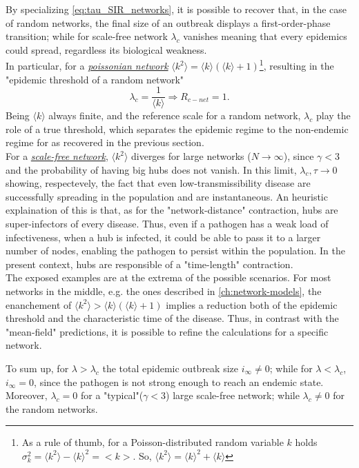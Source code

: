 \documentclass[a4paper,10pt,twoside]{book} %
\theoremstyle{definition}
\begin{document}
By specializing \autoref{eq:tau_SIR_networks}, it is possible to recover that, in the case of random networks, the final size of an outbreak displays a first-order-phase transition; while for scale-free network $\lambda_c$ vanishes meaning that every epidemics could spread, regardless its biological weakness.
\\In particular, for a \underline{\textit{poissonian network}} $\langle k^2 \rangle = \langle k \rangle (\langle k \rangle + 1 )$\footnote{As a rule of thumb, for a Poisson-distributed random variable $k$ holds $\sigma_k^2 = \langle k^2 \rangle - \langle k \rangle^2 = <k>$. So, $\langle k^2 \rangle = \langle k \rangle^2 + \langle k \rangle$}, 
resulting in the "epidemic threshold of a random network" \cite{barabasi::2016networkbook}
\[ \lambda_c = 
	\frac{1}{\langle k \rangle} \Rightarrow R_{c-net} = 1.
\]
Being $\langle k \rangle$ always finite, and the reference scale for a random network, $\lambda_c$ play the role of a true threshold, which separates the epidemic regime to the non-endemic regime for as recovered in the previous section.
\\For a \underline{\textit{scale-free network}}, $\langle k^2 \rangle$ diverges for large networks ($N\to \infty$), since $\gamma < 3$ and the probability of having big hubs does not vanish. In this limit, $\lambda_c, \tau \to 0$ showing, respectevely, the fact that even low-transmissibility disease are successfully spreading in the population and are instantaneous.
An heuristic explaination of this is that, as for the "network-distance" contraction, hubs are super-infectors of every disease. Thus, even if a pathogen has a weak load of infectiveness, when a hub is infected, it could be able to pass it to a larger number of nodes, enabling the pathogen to persist within the population. In the present context, hubs are responsible of a "time-length" contraction.
\\The exposed examples are at the extrema of the possible scenarios. For most networks in the middle, e.g. the ones described in \autoref{ch:network-models}, the enanchement of $\langle k^2 \rangle > \langle k \rangle (\langle k \rangle +1)$ implies a reduction both of the epidemic threshold and the characteristic time of the disease. Thus, in contrast with the "mean-field" predictions, it is possible to refine the calculations for a specific network.

To sum up, for $\lambda>\lambda_c$ the total epidemic outbreak size $i_{\infty} \neq0$; while for $\lambda < \lambda_c$, $i_{\infty} = 0$, since the pathogen is not strong enough to reach an endemic state.
Moreover, $\lambda_c = 0$ for a "typical"($\gamma<3$) large scale-free network; while $\lambda_c \neq0$ for the random networks.
\end{document}
